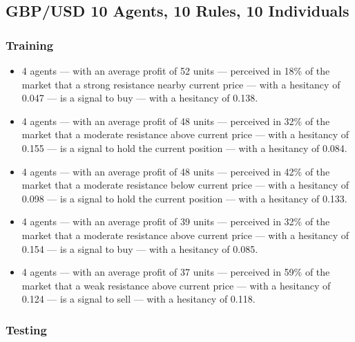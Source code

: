 \subsection{GBP/USD 10 Agents, 10 Rules, 10 Individuals}
\label{results:interpretation-gbp-usd-10agents-10rules-10individuals}

\subsubsection{Training}

{\small
  \begin{itemize}
  \item 4 agents — with an average profit of 52 units — perceived in 18\% of the market that a strong resistance nearby current price — with a hesitancy of 0.047 — is a signal to buy — with a hesitancy of 0.138.
  \item 4 agents — with an average profit of 48 units — perceived in 32\% of the market that a moderate resistance above current price — with a hesitancy of 0.155 — is a signal to hold the current position — with a hesitancy of 0.084.
  \item 4 agents — with an average profit of 48 units — perceived in 42\% of the market that a moderate resistance below current price — with a hesitancy of 0.098 — is a signal to hold the current position — with a hesitancy of 0.133.
  \item 4 agents — with an average profit of 39 units — perceived in 32\% of the market that a moderate resistance above current price — with a hesitancy of 0.154 — is a signal to buy — with a hesitancy of 0.085.
  \item 4 agents — with an average profit of 37 units — perceived in 59\% of the market that a weak resistance above current price — with a hesitancy of 0.124 — is a signal to sell — with a hesitancy of 0.118.
  \end{itemize}
}

\subsubsection{Testing}

